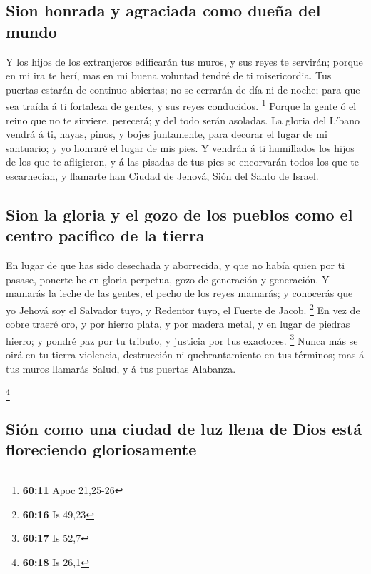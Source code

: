\hypertarget{sion-honrada-y-agraciada-como-dueuxf1a-del-mundo}{%
\subsection{Sion honrada y agraciada como dueña del
mundo}\label{sion-honrada-y-agraciada-como-dueuxf1a-del-mundo}}

 Y los hijos de los extranjeros edificarán tus muros, y
sus reyes te servirán; porque en mi ira te herí, mas en mi buena
voluntad tendré de ti misericordia.  Tus puertas estarán
de continuo abiertas; no se cerrarán de día ni de noche; para que sea
traída á ti fortaleza de gentes, y sus reyes conducidos. \footnote{\textbf{60:11}
  Apoc 21,25-26}  Porque la gente ó el reino que no te
sirviere, perecerá; y del todo serán asoladas.  La gloria
del Líbano vendrá á ti, hayas, pinos, y bojes juntamente, para decorar
el lugar de mi santuario; y yo honraré el lugar de mis pies.
 Y vendrán á ti humillados los hijos de los que te
afligieron, y á las pisadas de tus pies se encorvarán todos los que te
escarnecían, y llamarte han Ciudad de Jehová, Sión del Santo de Israel.

\hypertarget{sion-la-gloria-y-el-gozo-de-los-pueblos-como-el-centro-pacuxedfico-de-la-tierra}{%
\subsection{Sion la gloria y el gozo de los pueblos como el centro
pacífico de la
tierra}\label{sion-la-gloria-y-el-gozo-de-los-pueblos-como-el-centro-pacuxedfico-de-la-tierra}}

 En lugar de que has sido desechada y aborrecida, y que
no había quien por ti pasase, ponerte he en gloria perpetua, gozo de
generación y generación.  Y mamarás la leche de las
gentes, el pecho de los reyes mamarás; y conocerás que yo Jehová soy el
Salvador tuyo, y Redentor tuyo, el Fuerte de Jacob. \footnote{\textbf{60:16}
  Is 49,23}  En vez de cobre traeré oro, y por hierro
plata, y por madera metal, y en lugar de piedras hierro; y pondré paz
por tu tributo, y justicia por tus exactores. \footnote{\textbf{60:17}
  Is 52,7}  Nunca más se oirá en tu tierra violencia,
destrucción ni quebrantamiento en tus términos; mas á tus muros llamarás
Salud, y á tus puertas Alabanza.

\footnote{\textbf{60:18} Is 26,1}

\hypertarget{siuxf3n-como-una-ciudad-de-luz-llena-de-dios-estuxe1-floreciendo-gloriosamente}{%
\subsection{Sión como una ciudad de luz llena de Dios está floreciendo
gloriosamente}\label{siuxf3n-como-una-ciudad-de-luz-llena-de-dios-estuxe1-floreciendo-gloriosamente}}

